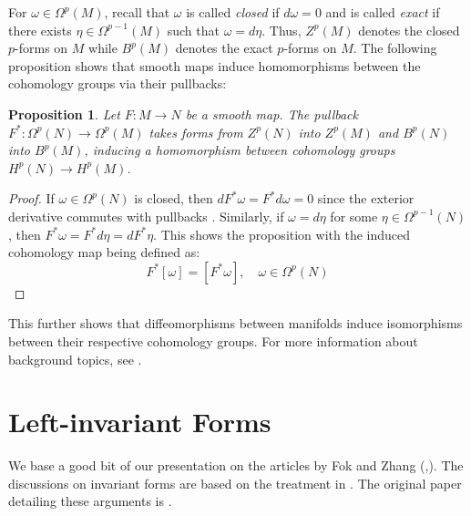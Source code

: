 \documentclass[12pt]{amsart}
\newtheorem{proposition}{Proposition}[theorem]
\numberwithin{equation}{section}
\begin{document}
For $\omega \in \Omega^p(M)$, recall that $\omega$ is called \emph{closed} if $d\omega = 0$ and is called \emph{exact} if there exists $\eta \in \Omega^{p-1}(M)$ such that $\omega = d\eta$. Thus, $Z^p(M)$ denotes the closed $p$-forms on $M$ while $B^p(M)$ denotes the exact $p$-forms on $M$. The following proposition shows that smooth maps induce homomorphisms between the cohomology groups via their pullbacks:
%
\begin{proposition}
  Let $F:M \rightarrow N$ be a smooth map. The pullback $F^*: \Omega^p(N) \rightarrow \Omega^p(M)$ takes forms from $Z^p(N)$ into $Z^p(M)$ and $B^p(N)$ into $B^p(M)$, inducing a homomorphism between cohomology groups $H^p(N) \rightarrow H^p(M)$.
\end{proposition}
%
\begin{proof}
  If $\omega \in \Omega^p(N)$ is closed, then $dF^*\omega = F^*d\omega = 0$ since the exterior derivative commutes with pullbacks . Similarly, if $\omega = d\eta$ for some $\eta \in \Omega^{p-1}(N)$, then $F^*\omega = F^*d\eta = dF^*\eta$. This shows the proposition with the induced cohomology map being defined as:
  $$ F^*[\omega] = [F^*\omega], \quad \omega \in \Omega^p(N) $$
\end{proof}
This further shows that diffeomorphisms between manifolds induce isomorphisms between their respective cohomology groups. For more information about background topics, see \cite{lee}.

\section{Left-invariant Forms}
We base a good bit of our presentation on the articles by Fok and Zhang (\cite{fok},\cite{zhang}). The discussions on invariant forms are based on the treatment in \cite{chevalley}. The original paper detailing these arguments is \cite{reeder}.
\end{document}
